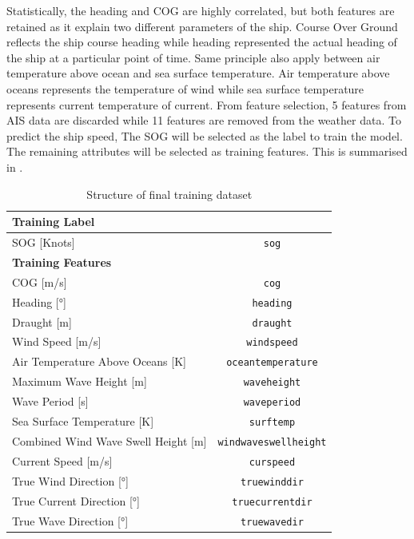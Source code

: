 Statistically, the heading and COG are highly correlated, but both features are retained as it explain two different parameters of the ship. Course Over Ground reflects the ship course heading while heading represented the actual heading of the ship at a particular point of time. Same principle also apply between air temperature above ocean and sea surface temperature. Air temperature above oceans represents the temperature of wind while sea surface temperature represents current temperature of current. From feature selection, 5 features from AIS data are discarded while 11 features are removed from the weather data. To predict the ship speed, The SOG will be selected as the label to train the model. The remaining attributes will be selected as training features. This is summarised in .

\begin{table}
    \footnotesize
    \centering
    {\begin{tabular}{ p{8cm}c }
    \hline
    \multicolumn{2}{l}{\textbf{Training Label}}\\
    \hline
    SOG [Knots] & {\tt sog} \\
    \hline
    \multicolumn{2}{l}{\textbf{Training Features}}\\
    \hline
    COG [m/s] & {\tt cog}  \\
    Heading [°] & {\tt heading}  \\
    Draught [m] & {\tt draught} \\
    Wind Speed [m/s] & {\tt windspeed} \\
    Air Temperature Above Oceans [K] & {\tt oceantemperature} \\
    Maximum Wave Height [m] & {\tt waveheight} \\
    Wave Period [s] & {\tt waveperiod}\\
    Sea Surface Temperature [K] & {\tt surftemp}\\
    Combined Wind Wave Swell Height [m] &  {\tt windwaveswellheight} \\
    Current Speed [m/s] & {\tt curspeed} \\
    True Wind Direction [°] & {\tt truewinddir}  \\
    True Current Direction [°] & {\tt truecurrentdir} \\
    True Wave Direction [°] & {\tt truewavedir} \\
    \hline
    \end{tabular}}
\caption{Structure of final training dataset}\label{tbl:struct_train_final}
\end{table}

